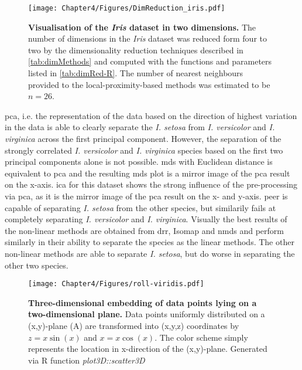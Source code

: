 \begin{figure}[h!]
	\centering
	\texttt{[image: Chapter4/Figures/DimReduction\_iris.pdf]}
	\caption[\textbf{Visualisation of the \textit{Iris} dataset in two dimensions.}]{\textbf{Visualisation of the \textit{Iris} dataset in two dimensions.} The number of dimensions in the \textit{Iris} dataset was reduced form four to two by the dimensionality reduction techniques described in \cref{tab:dimMethods} and computed with the functions and parameters listed in \cref{tab:dimRed-R}. The number of nearest neighbours provided to the local-proximity-based methods was estimated to be \(n=26\).} 
	 	\label{fig:dimRed-iris}
\end{figure}

\gls{pca}, i.e. the representation of the data based on the direction of highest variation in the data is able to clearly separate the \textit{I. setosa} from \textit{I. versicolor} and \textit{I. virginica} across the first principal component. However, the separation of the strongly correlated \textit{I. versicolor} and \textit{I. virginica} species based on the first two principal components alone is not possible. \gls{mds} with Euclidean distance is equivalent to \gls{pca} and the resulting \gls{mds} plot is a mirror image of the \gls{pca} result on the x-axis. \gls{ica} for this dataset shows the strong influence of the pre-processing via \gls{pca}, as it is the mirror image of the \gls{pca} result on the x- and y-axis. \gls{peer} is capable of separating \textit{I. setosa} from the other species, but similarily fails at completely separating \textit{I. versicolor} and \textit{I. virginica}. 
Visually the best results of the non-linear methods are obtained from \gls{drr}, Isomap and \gls{nmds} and perform similarly in their ability to separate the species as the linear methods. The other non-linear methods are able to separate \textit{I. setosa}, but do worse in separating the other two species.

\begin{figure}[p]
	\centering
	\texttt{[image: Chapter4/Figures/roll-viridis.pdf]}\\
	\caption[\textbf{Three-dimensional embedding of datapoints lying on a two-dimensional plane.}]{\textbf{Three-dimensional embedding of data points lying on a two-dimensional plane.} Data points uniformly distributed on a (x,y)-plane (A) are transformed into (x,y,z) coordinates by \(z = x \sin(x)\) and \(x = x \cos(x)\). The color scheme simply represents the location in x-direction of the (x,y)-plane.  Generated via R function \textit{plot3D::scatter3D}}
 	\label{fig:roll}
\end{figure}

